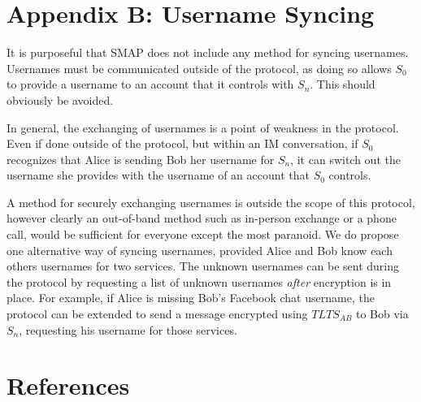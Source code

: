 \documentclass[twoside,10pt]{article}
\begin{document}
\begin{multicols}{2}
\section{Appendix B: Username Syncing}
It is purposeful that SMAP does not include any method for syncing usernames.  Usernames must be communicated outside of the protocol, as doing so allows $S_0$ to provide a username to an account that it controls with $S_n$.  This should obviously be avoided.

In general, the exchanging of usernames is a point of weakness in the protocol.  Even if done outside of the protocol, but within an IM conversation, if $S_0$ recognizes that Alice is sending Bob her username for $S_n$, it can switch out the username she provides with the username of an account that $S_0$ controls.

A method for securely exchanging usernames is outside the scope of this protocol, however clearly an out-of-band method such as in-person exchange or a phone call, would be sufficient for everyone except the most paranoid.  We do propose one alternative way of syncing usernames, provided Alice and Bob know each others usernames for two services.  The unknown usernames can be sent during the protocol by requesting a list of unknown usernames \emph{after} encryption is in place.  For example, if Alice is missing Bob's Facebook chat username, the protocol can be extended to send a message encrypted using $TLTS_{AB}$ to Bob via $S_n$, requesting his username for those services.

\section{References}




\end{multicols}
\end{document}
